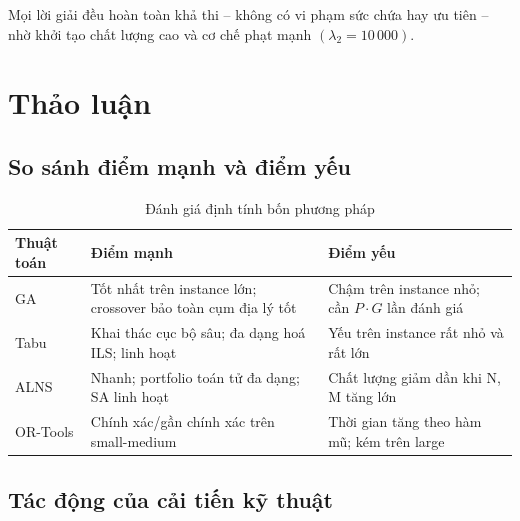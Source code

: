 \documentclass[12pt, a4paper]{article}
\begin{document}
Mọi lời giải đều hoàn toàn khả thi -- không có vi phạm sức chứa hay ưu tiên -- nhờ khởi tạo chất lượng cao và cơ chế phạt mạnh $(\lambda_2 = 10\,000)$.

\section{Thảo luận}

\subsection{So sánh điểm mạnh và điểm yếu}

\begin{table}[H]
\centering
\caption{Đánh giá định tính bốn phương pháp}
\begin{tabular}{lp{5cm}p{5cm}}
\toprule
\textbf{Thuật toán} & \textbf{Điểm mạnh} & \textbf{Điểm yếu} \\
\midrule
GA    & Tốt nhất trên instance lớn; crossover bảo toàn cụm địa lý tốt & Chậm trên instance nhỏ; cần $P \cdot G$ lần đánh giá \\
Tabu  & Khai thác cục bộ sâu; đa dạng hoá ILS; linh hoạt & Yếu trên instance rất nhỏ và rất lớn \\
ALNS  & Nhanh; portfolio toán tử đa dạng; SA linh hoạt & Chất lượng giảm dần khi N, M tăng lớn \\
OR-Tools & Chính xác/gần chính xác trên small-medium & Thời gian tăng theo hàm mũ; kém trên large \\
\bottomrule
\end{tabular}
\end{table}

\subsection{Tác động của cải tiến kỹ thuật}
\end{document}
